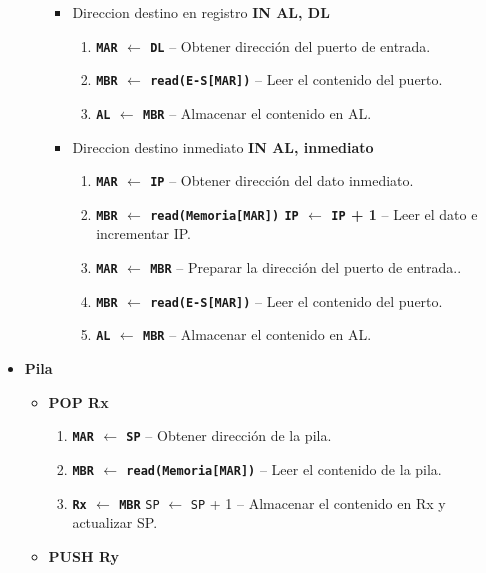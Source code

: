 \documentclass[12pt,oneside]{templates/unerthesis}
\providecommand{\tightlist}{%
  \setlength{\itemsep}{0pt}\setlength{\parskip}{0pt}}
\begin{document}
\begin{itemize}
\begin{itemize}
    \begin{itemize}
    \tightlist
    \item
      Direccion destino en registro \textbf{IN AL, DL}

      \begin{enumerate}
      \def\labelenumi{\arabic{enumi}.}
      \setcounter{enumi}{3}
      \tightlist
      \item
        \textbf{\texttt{MAR} \(\leftarrow\) \texttt{DL}} -- Obtener dirección del puerto de entrada.
      \item
        \textbf{\texttt{MBR} \(\leftarrow\) \texttt{read(E-S{[}MAR{]})}} -- Leer el contenido del puerto.
      \item
        \textbf{\texttt{AL} \(\leftarrow\) \texttt{MBR}} -- Almacenar el contenido en AL.
      \end{enumerate}
    \item
      Direccion destino inmediato \textbf{IN AL, inmediato}

      \begin{enumerate}
      \def\labelenumi{\arabic{enumi}.}
      \setcounter{enumi}{3}
      \tightlist
      \item
        \textbf{\texttt{MAR} \(\leftarrow\) \texttt{IP}} -- Obtener dirección del dato inmediato.
      \item
        \textbf{\texttt{MBR} \(\leftarrow\) \texttt{read(Memoria{[}MAR{]})} \textbar{} \texttt{IP} \(\leftarrow\) \texttt{IP} + 1} -- Leer el dato e incrementar IP.
      \item
        \textbf{\texttt{MAR} \(\leftarrow\) \texttt{MBR}} -- Preparar la dirección del puerto de entrada..
      \item
        \textbf{\texttt{MBR} \(\leftarrow\) \texttt{read(E-S{[}MAR{]})}} -- Leer el contenido del puerto.
      \item
        \textbf{\texttt{AL} \(\leftarrow\) \texttt{MBR}} -- Almacenar el contenido en AL.
      \end{enumerate}
    \end{itemize}
  \end{itemize}
\item
  \textbf{Pila}

  \begin{itemize}
  \tightlist
  \item
    \textbf{POP Rx}

    \begin{enumerate}
    \def\labelenumi{\arabic{enumi}.}
    \setcounter{enumi}{3}
    \tightlist
    \item
      \textbf{\texttt{MAR} \(\leftarrow\) \texttt{SP}} -- Obtener dirección de la pila.
    \item
      \textbf{\texttt{MBR} \(\leftarrow\) \texttt{read(Memoria{[}MAR{]})}} -- Leer el contenido de la pila.
    \item
      \textbf{\texttt{Rx} \(\leftarrow\) \texttt{MBR}} \textbar{} \texttt{SP} \(\leftarrow\) \texttt{SP} + 1 -- Almacenar el contenido en Rx y actualizar SP.
    \end{enumerate}
  \item
    \textbf{PUSH Ry}


\end{itemize}
\end{itemize}
\end{document}
